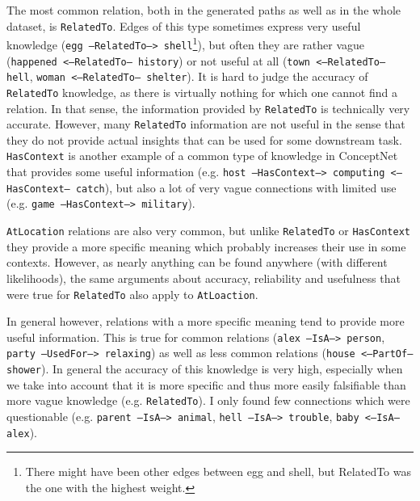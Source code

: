 \documentclass{article}
\begin{document}
The most common relation, both in the generated paths as well as in
the whole dataset, is \texttt{RelatedTo}. Edges of this type sometimes
express very useful knowledge (\texttt{egg --RelatedTo-->
  shell}\footnote{There might have been other edges between egg and
  shell, but RelatedTo was the one with the highest weight.}), but
often they are rather vague (\texttt{happened <--RelatedTo-- history})
or not useful at all (\texttt{town <--RelatedTo-- hell}, \texttt{woman
  <--RelatedTo-- shelter}). It is hard to judge the accuracy of
\texttt{RelatedTo} knowledge, as there is virtually nothing for which
one cannot find a relation. In that sense, the information provided by
\texttt{RelatedTo} is technically very accurate.  However, many
\texttt{RelatedTo} information are not useful in the sense that they do not
provide actual insights that can be used for some downstream
task. \texttt{HasContext} is another example of a common type of knowledge in
ConceptNet that provides some useful information
(e.g. \texttt{host --HasContext--> computing <--HasContext-- catch}),
but also a lot of very vague connections with limited use
(e.g. \texttt{game --HasContext--> military}).

\texttt{AtLocation} relations are also very common, but unlike
\texttt{RelatedTo} or \texttt{HasContext} they provide a more specific
meaning which probably increases their use in some contexts.  However,
as nearly anything can be found anywhere (with different likelihoods),
the same arguments about accuracy, reliability and usefulness that
were true for \texttt{RelatedTo} also apply to \texttt{AtLoaction}.

In general however, relations with a more specific meaning tend to
provide more useful information. This is true for common relations
(\texttt{alex --IsA--> person}, \texttt{party --UsedFor--> relaxing})
as well as less common relations (\texttt{house <--PartOf--
  shower}). In general the accuracy of this knowledge is very high,
especially when we take into account that it is more specific and thus
more easily falsifiable than more vague knowledge
(e.g. \texttt{RelatedTo}). I only found few connections which were
questionable (e.g. \texttt{parent --IsA--> animal}, \texttt{hell
  --IsA--> trouble}, \texttt{baby <--IsA-- alex}).
\end{document}
